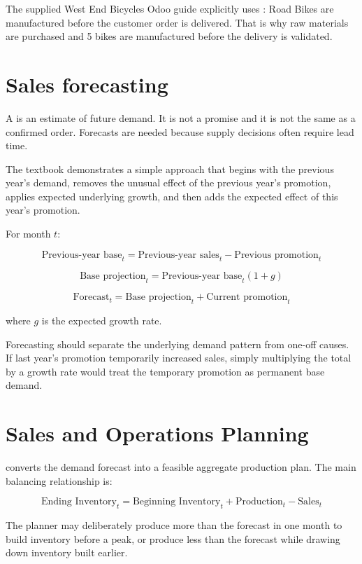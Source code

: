 The supplied West End Bicycles Odoo guide explicitly uses : Road Bikes are manufactured before the customer order is delivered. That is why raw materials are purchased and 5 bikes are manufactured before the delivery is validated.

\section{Sales forecasting}

A  is an estimate of future demand. It is not a promise and it is not the same as a confirmed order. Forecasts are needed because supply decisions often require lead time.

The textbook demonstrates a simple approach that begins with the previous year's demand, removes the unusual effect of the previous year's promotion, applies expected underlying growth, and then adds the expected effect of this year's promotion.

For month $t$:

\[
\text{Previous-year base}_t
= \text{Previous-year sales}_t - \text{Previous promotion}_t
\]

\[
\text{Base projection}_t
= \text{Previous-year base}_t(1+g)
\]

\[
\text{Forecast}_t
= \text{Base projection}_t + \text{Current promotion}_t
\]

where $g$ is the expected growth rate.

\begin{keyidea}
Forecasting should separate the underlying demand pattern from one-off causes. If last year's promotion temporarily increased sales, simply multiplying the total by a growth rate would treat the temporary promotion as permanent base demand.
\end{keyidea}

\section{Sales and Operations Planning}

 converts the demand forecast into a feasible aggregate production plan. The main balancing relationship is:

\[
\text{Ending Inventory}_t
= \text{Beginning Inventory}_t + \text{Production}_t - \text{Sales}_t
\]

The planner may deliberately produce more than the forecast in one month to build inventory before a peak, or produce less than the forecast while drawing down inventory built earlier.

